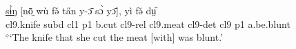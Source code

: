 \documentclass[10pt,twoside]{article}
\newcommand{\gl}[1]{`#1'}
\def\VSP{\vspace{0pt}}
\newcommand{\cl}[1]{{\sc cl#1}}
\def\elicited{$^\diamond$}
\begin{document}
\begin{exe}
%
	\ex \label{exTheKnifeThatSheCut}	
		\gll \uline{sɨ̀ŋ} [nō̤ wù fə̌ ta̋n y-ɔ̄ sɔ̀ yɔ̄], yì fə̌ dṳ᷆	\\
		\cl9.knife {\sc subd} \cl1  {\sc p1} b.cut \cl9-{\sc rel} \cl9.meat \cl9-{\sc det} \cl9  {\sc p1} a.be.blunt	\\
		\glt \VSP \elicited \gl{The knife that she cut the meat [with] was blunt.}

\end{exe}
\end{document}

